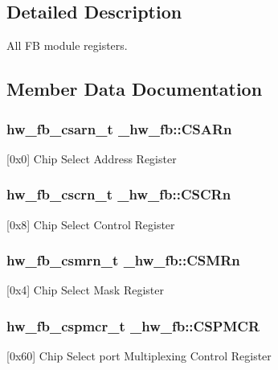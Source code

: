 \subsection{Detailed Description}
All FB module registers. 

\subsection{Member Data Documentation}
\subsubsection[{\texorpdfstring{C\+S\+A\+Rn}{CSARn}}]{ {\bf hw\+\_\+fb\+\_\+csarn\+\_\+t} \+\_\+hw\+\_\+fb\+::\+C\+S\+A\+Rn}\hypertarget{struct__hw__fb_a6f6705c0a01e210de6a9b542d1fa413b}{}\label{struct__hw__fb_a6f6705c0a01e210de6a9b542d1fa413b}
\mbox{[}0x0\mbox{]} Chip Select Address Register 
\subsubsection[{\texorpdfstring{C\+S\+C\+Rn}{CSCRn}}]{ {\bf hw\+\_\+fb\+\_\+cscrn\+\_\+t} \+\_\+hw\+\_\+fb\+::\+C\+S\+C\+Rn}\hypertarget{struct__hw__fb_adca92a82a144e4395d9d058856e0c86c}{}\label{struct__hw__fb_adca92a82a144e4395d9d058856e0c86c}
\mbox{[}0x8\mbox{]} Chip Select Control Register 
\subsubsection[{\texorpdfstring{C\+S\+M\+Rn}{CSMRn}}]{ {\bf hw\+\_\+fb\+\_\+csmrn\+\_\+t} \+\_\+hw\+\_\+fb\+::\+C\+S\+M\+Rn}\hypertarget{struct__hw__fb_af50654554bc7984891f2692ab12996f6}{}\label{struct__hw__fb_af50654554bc7984891f2692ab12996f6}
\mbox{[}0x4\mbox{]} Chip Select Mask Register 
\subsubsection[{\texorpdfstring{C\+S\+P\+M\+CR}{CSPMCR}}]{ {\bf hw\+\_\+fb\+\_\+cspmcr\+\_\+t} \+\_\+hw\+\_\+fb\+::\+C\+S\+P\+M\+CR}\hypertarget{struct__hw__fb_aa48c688bd99fa9f106382ae409fb8081}{}\label{struct__hw__fb_aa48c688bd99fa9f106382ae409fb8081}
\mbox{[}0x60\mbox{]} Chip Select port Multiplexing Control Register 

